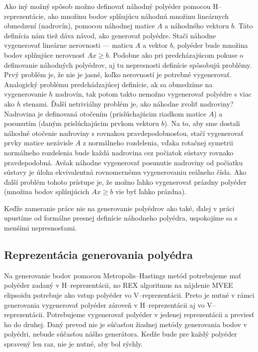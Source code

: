 Ako iný možný spôsob možno definovať náhodný polyéder pomocou H--reprezentácie, ako množinu bodov splňujúcu náhodnú množinu lineárnych obmedzení (nadrovín), pomocou náhodnej matice $A$ a náhodného vektoru $b$. Táto definícia nám tiež dáva návod, ako generovať polyédre. Stačí náhodne vygenerovať lineárne nerovnosti --- maticu $A$ a vektor $b$, polyéder bude množina bodov splňujúce nerovnosť $Ax\geq b$. Podobne ako pri predcházajúcom pokuse o definovanie náhodných polyédrov, aj tu nepresnosti definície spôsobujú problémy. Prvý problém je, že nie je jasné, koľko nerovností je potrebné vygenerovať. Analogický problému predchádzajúcej definície, ak sa obmedzíme na vygenerovanie $h$ nadrovín, tak potom takto nemožno vygenerovať polyédre s viac ako $h$ stenami.
Ďalší netriviálny problém je, ako náhodne zvoliť nadroviny? Nadrovina je definovaná otočením (prislúchajúcim riadkom matice $A$) a posunutím (daným prislúchajúcim prvkom vektoru $b$). Na to, aby sme dostali náhodné otočenie nadroviny s rovnakou pravdepodobnosťou, stačí vygenerovať prvky matice nezávisle $A$ z normálneho rozdelenia, vďaka rotačnej symetrii normálneho rozdelenia bude každá nadrovina cez počiatok sústavy rovnako pravdepodobná. Avšak náhodne vygenerovať posunutie nadroviny od počiatku sústavy je úloha ekvivalentná rovnomernému vygenerovaniu reálneho čísla. Ako ďalší problém tohoto prístupe je, že možno ľahko vygenerovať prázdny polyéder (množina bodov splňujúcich $Ax \geq b$ vie byť ľahko prázdna).

Keďže zameranie práce nie na generovanie polyédrov ako také, ďalej v práci upustíme od formálne presnej definície náhodneho polyédra, uspokojíme sa s menšími nepresnosťami.\\

\subsection{Reprezentácia generovania polyédra}
Na generovanie bodov pomocou Metropolis--Hastings metód potrebujeme mať polyéder zadaný v H--reprezentácii, no REX algoritmus na nájdenie MVEE elipsoidu potrebuje ako vstup polyéder vo V--reprezentácii. Preto je nutné v rámci generovania vygenerovať polyéder zároveň v H--reprezentácii aj vo V--reprezentácii. Potrebujeme vygenerovať polyéder v jedenej reprezentácii a previesť ho do druhej. Daný prevod nie je súčasťou žiadnej metódy generovania bodov v polyédri, nebude súčasťou nášho generátora. Kedže bude pre každý polyéder spravený len raz, nie je nutné, aby bol rýchly.\\

